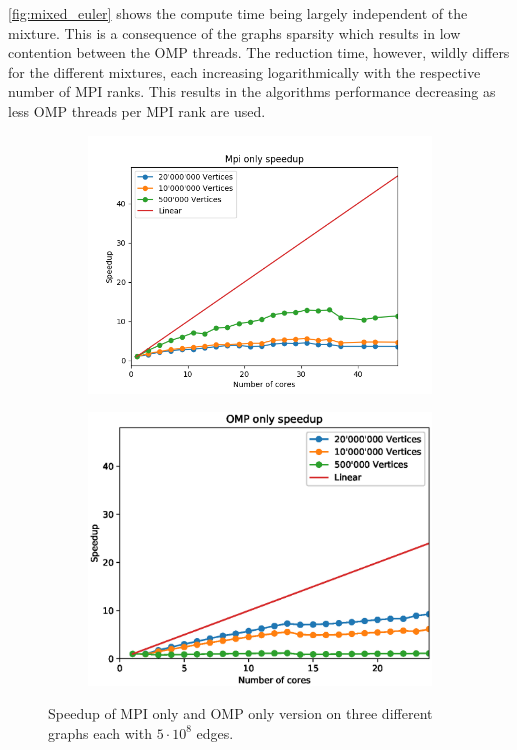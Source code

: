 \autoref{fig:mixed_euler} shows the compute time being largely independent of the mixture. This is a consequence of the graphs sparsity which results in low contention between the OMP threads. The reduction time, however, wildly differs for the different mixtures, each increasing logarithmically with the respective number of MPI ranks. This results in the algorithms performance decreasing as less OMP threads per MPI rank are used.


\begin{figure}
\begin{subfigure}[c]{0.23\textwidth}
\includegraphics[width=\textwidth]{plots/mpi_speedup_with_ref}
\label{fig:speedup_mpi}
\end{subfigure}
\begin{subfigure}[c]{0.23\textwidth}
\includegraphics[width=\textwidth]{plots/omp_speedup_with_ref}
\label{fig:speedup_omp}
\end{subfigure}
\caption{Speedup of MPI only and OMP only version on three different graphs each with $5\cdot10^{8}$ edges.}
\label{fig:speedup}
\end{figure}

